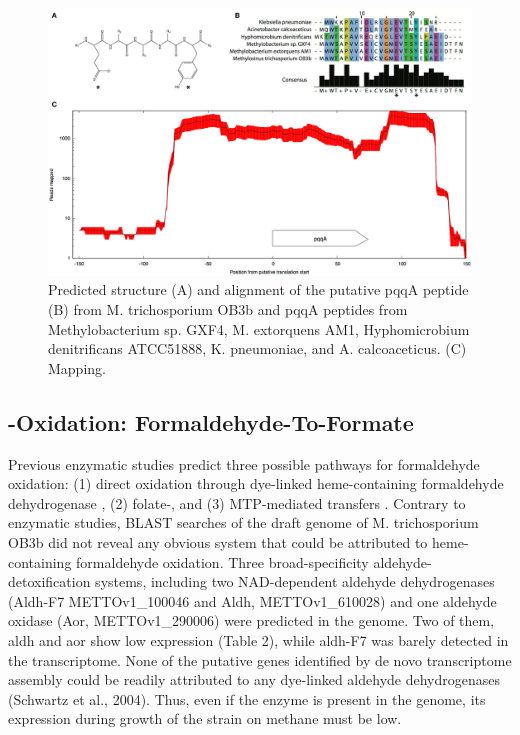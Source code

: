 \begin{figure}[H]
\centering
     \includegraphics[width=1.0\textwidth]{./tex/chapter1/figures/figure2.png}
     \begin{singlespace}
     \caption[pqqA structure, alignment, and RNA-seq coverage]{
        Predicted structure
        (A) and alignment of the putative pqqA peptide
        (B) from M. trichosporium OB3b and pqqA peptides from Methylobacterium sp. GXF4, M. extorquens AM1,
            Hyphomicrobium denitrificans ATCC51888, K. pneumoniae, and A. calcoaceticus.
        (C) Mapping.}
     \end{singlespace}
     \label{fig:B_pqqA}
\end{figure}


\subsection{-Oxidation: Formaldehyde-To-Formate}
Previous enzymatic studies predict three possible pathways for formaldehyde oxidation: (1) direct oxidation through dye-linked heme-containing formaldehyde dehydrogenase \cite{patel1980}, (2) folate-, and (3) MTP-mediated  transfers \cite{vorholt1999, doronina2008}.
Contrary to enzymatic studies, BLAST searches of the draft genome of M. trichosporium OB3b did not reveal any obvious system that could be attributed to heme-containing formaldehyde oxidation.
Three broad-specificity aldehyde-detoxification systems, including two NAD-dependent aldehyde dehydrogenases (Aldh-F7 METTOv1\_100046 and Aldh, METTOv1\_610028) and one aldehyde oxidase (Aor, METTOv1\_290006) were predicted in the genome.
Two of them, aldh and aor show low expression (Table 2), while aldh-F7 was barely detected in the transcriptome.
None of the putative genes identified by de novo transcriptome assembly could be readily attributed to any dye-linked aldehyde dehydrogenases (Schwartz et al., 2004).
Thus, even if the enzyme is present in the genome, its expression during growth of the strain on methane must be low.

